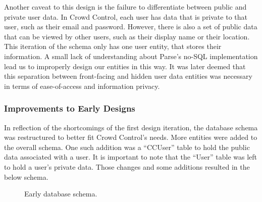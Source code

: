 Another caveat to this design is the failure to differentiate between public and private user data. In Crowd Control, each user has data that is private to that user, such as their email and password. However, there is also a set of public data that can be viewed by other users, such as their display name or their location. This iteration of the schema only has one user entity, that stores their information. A small lack of understanding about Parse's no-SQL implementation lead us to improperly design our entities in this way. It was later deemed that this separation between front-facing and hidden user data entities was necessary in terms of ease-of-access and information privacy.

\subsubsection{Improvements to Early Designs}
In reflection of the shortcomings of the first design iteration, the database schema was restructured to better fit Crowd Control's needs. More entities were added to the overall schema. One such addition was a ``CCUser'' table to hold the public data associated with a user. It is important to note that the ``User'' table was left to hold a user's private data. Those changes and some additions resulted in the below schema. 

	\begin{figure}[tbh]
	\begin{center}
	\end{center}
	\caption{Early database schema. \label{EarlyDBSchema}}
	\end{figure}

